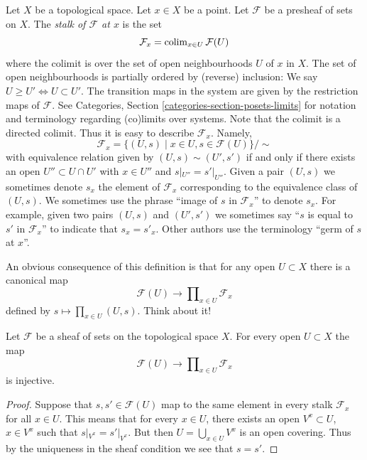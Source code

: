\noindent
Let $X$ be a topological space. Let $x \in X$ be a point.
Let $\mathcal{F}$ be a presheaf of sets on $X$.
The {\it stalk of $\mathcal{F}$ at $x$} is the set
$$
\mathcal{F}_x
=
\mathop{\mathrm{colim}}\nolimits_{x\in U} \mathcal{F}(U)
$$
where the colimit is over the set of open neighbourhoods
$U$ of $x$ in $X$. The set of open neighbourhoods is
partially ordered by (reverse) inclusion:
We say $U \geq U' \Leftrightarrow U \subset U'$.
The transition maps in the system are
given by the restriction maps of $\mathcal{F}$.
See Categories, Section \ref{categories-section-posets-limits}
for notation and terminology regarding (co)limits over systems.
Note that the colimit is a directed colimit.
Thus it is easy to describe $\mathcal{F}_x$. Namely,
$$
\mathcal{F}_x
=
\{
(U, s)
\mid
x\in U, s\in \mathcal{F}(U)
\}/\sim
$$
with equivalence relation given by $(U, s) \sim (U', s')$ if and only if
there exists an open $U'' \subset U \cap U'$ with $x \in U''$ and
$s|_{U''} = s'|_{U''}$. Given a pair $(U, s)$ we sometimes denote
$s_x$ the element of $\mathcal{F}_x$ corresponding to the equivalence
class of $(U, s)$. We sometimes use the phrase
``image of $s$ in $\mathcal{F}_x$'' to denote $s_x$.
For example, given two pairs $(U, s)$ and $(U', s')$ we sometimes
say ``$s$ is equal to $s'$ in $\mathcal{F}_x$'' to indicate
that $s_x = s'_x$. Other authors use the terminology
``germ of $s$ at $x$''.

\medskip\noindent
An obvious consequence of this definition is that
for any open $U \subset X$ there is a canonical map
$$
\mathcal{F}(U)
\longrightarrow
\prod\nolimits_{x \in U} \mathcal{F}_x
$$
defined by $s \mapsto \prod_{x \in U} (U, s)$. Think about it!

\begin{lemma}
\label{lemma-sheaf-subset-stalks}
Let $\mathcal{F}$ be a sheaf of sets on the topological space $X$.
For every open $U \subset X$ the map
$$
\mathcal{F}(U)
\longrightarrow
\prod\nolimits_{x \in U} \mathcal{F}_x
$$
is injective.
\end{lemma}

\begin{proof}
Suppose that $s, s' \in \mathcal{F}(U)$ map to the same element
in every stalk $\mathcal{F}_x$ for all $x \in U$. This means that
for every $x \in U$, there exists an open $V^x \subset U$,
$x \in V^x$ such that $s|_{V^x} = s'|_{V^x}$. But then
$U = \bigcup_{x \in U} V^x$ is an open covering. Thus by the
uniqueness in the sheaf condition we see that $s = s'$.
\end{proof}

